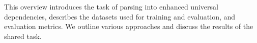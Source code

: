 This overview introduces the task of parsing into enhanced universal dependencies, describes the datasets used for training and evaluation, and evaluation metrics. We outline various approaches and discuss the results of the shared task.
